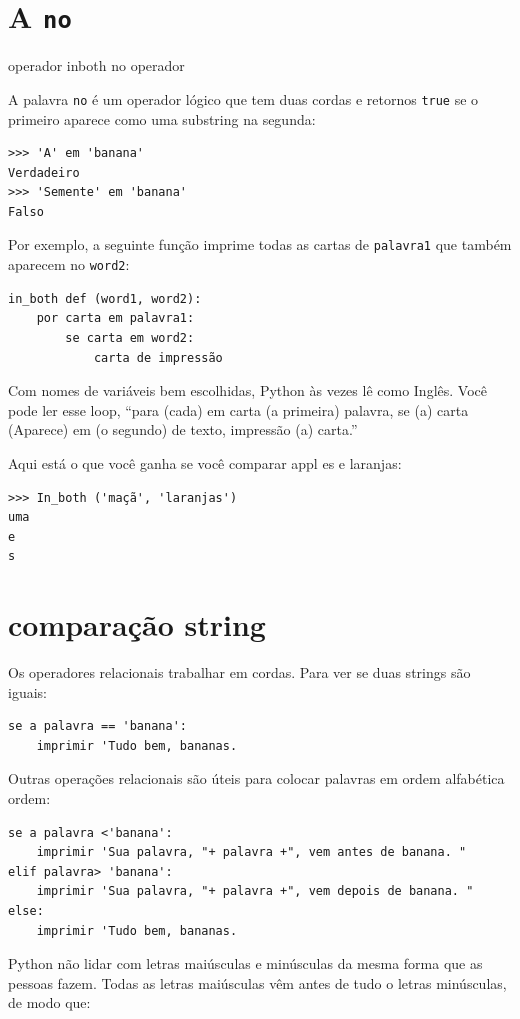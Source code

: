 \documentclass[10pt]{book}
\begin{document}
\begin{exercise}
\section{A {\tt no}} operador
\label{} inboth
\index{} no operador

A palavra {\tt no} é um operador lógico que tem duas cordas e
retornos {\tt true} se o primeiro aparece como uma substring na segunda:

\begin{verbatim}
>>> 'A' em 'banana'
Verdadeiro
>>> 'Semente' em 'banana'
Falso
\end{verbatim}
%
Por exemplo, a seguinte função imprime todas as
cartas de {\tt palavra1} que também aparecem no {\tt word2}:

\begin{verbatim}
in_both def (word1, word2):
    por carta em palavra1:
        se carta em word2:
            carta de impressão
\end{verbatim}
%
Com nomes de variáveis ​​bem escolhidas,
Python às vezes lê como Inglês. Você pode ler
esse loop, ``para (cada) em carta (a primeira) palavra, se (a) carta 
(Aparece) em (o segundo) de texto, impressão (a) carta.''

Aqui está o que você ganha se você comparar appl es e laranjas:

\begin{verbatim}
>>> In_both ('maçã', 'laranjas')
uma
e
s
\end{verbatim}
%

\section{comparação string}

Os operadores relacionais trabalhar em cordas. Para ver se duas strings são iguais:

\begin{verbatim}
se a palavra == 'banana':
    imprimir 'Tudo bem, bananas.
\end{verbatim}
%
Outras operações relacionais são úteis para colocar palavras em ordem alfabética
ordem:

\begin{verbatim}
se a palavra <'banana':
    imprimir 'Sua palavra, "+ palavra +", vem antes de banana. "
elif palavra> 'banana':
    imprimir 'Sua palavra, "+ palavra +", vem depois de banana. "
else:
    imprimir 'Tudo bem, bananas.
\end{verbatim}
%
Python não lidar com letras maiúsculas e minúsculas da mesma forma
que as pessoas fazem. Todas as letras maiúsculas vêm antes de tudo o
letras minúsculas, de modo que:


\end{exercise}
\end{document}
